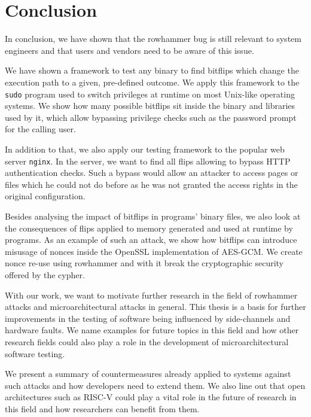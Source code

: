 \chapter{Conclusion}\label{sec:conclusion}

In conclusion, we have shown that the rowhammer bug is still relevant to system
engineers and that users and vendors need to be aware of this issue.

We have shown a framework to test any binary to find bitflips which change the
execution path to a given, pre-defined outcome. We apply this framework to the
\texttt{sudo} program used to switch privileges at runtime on most Unix-like
operating systems. We show how many possible bitflips sit inside the binary and
libraries used by it, which allow bypassing privilege checks such as the
password prompt for the calling user.

In addition to that, we also apply our testing framework to the popular web
server \texttt{nginx}. In the server, we want to find all flips allowing to
bypass HTTP authentication checks. Such a bypass would allow an attacker to
access pages or files which he could not do before as he was not granted the
access rights in the original configuration.

Besides analysing the impact of bitflips in programs' binary files, we also look
at the consequences of flips applied to memory generated and used at runtime by
programs. As an example of such an attack, we show how bitflips can introduce
misusage of nonces inside the OpenSSL implementation of AES-GCM. We create nonce
re-use using rowhammer and with it break the cryptographic security offered by
the cypher.

With our work, we want to motivate further research in the field of rowhammer
attacks and microarchitectural attacks in general. This thesis is a basis for
further improvements in the testing of software being influenced by
side-channels and hardware faults. We name examples for future topics in this
field and how other research fields could also play a role in the development of
microarchitectural software testing.

We present a summary of countermeasures already applied to systems against such
attacks and how developers need to extend them. We also line out that open
architectures such as RISC-V could play a vital role in the future of research
in this field and how researchers can benefit from them.

